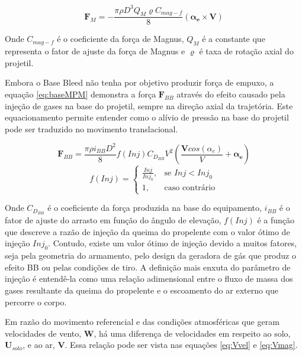 \begin{equation}
    \label{eq:magnusMPM}
    \boldsymbol{F}_{M} = -\frac{\pi \rho D^{3} Q_{M} \varrho C_{mag-f}}{8}(\boldsymbol{\alpha_{e}} \times \boldsymbol{V})
\end{equation}

Onde \(C_{mag-f}\) é o coeficiente da força de Magnus, \(Q_{M}\) é a constante que representa o fator de ajuste da força de Magnus e \(\varrho\) é taxa de rotação axial do projetil.

Embora o Base Bleed não tenha por objetivo produzir força de empuxo, a equação \ref{eq:baseMPM} demonstra a força \(\textbf{F}_{BB}\) através do efeito causado pela injeção de gases na base do projetil, sempre na direção axial da trajetória. Este equacionamento permite entender como o alívio de pressão na base do projetil pode ser traduzido no movimento translacional.

\begin{equation} \label{eq:baseMPM}
    \boldsymbol{F}_{BB} = \frac{\pi \rho i_{BB} D^{2}}{8} f(Inj) C_{D_{BB}}V^{2} \left(\frac{\boldsymbol{V}cos(\alpha_{e})}{V} +\boldsymbol{\alpha_{e}}\right)
\end{equation}
%
\begin{equation}
f(Inj) =\begin{cases}
			\frac{Inj}{Inj_{0}}, & \text{se \(Inj < Inj_{0}\)}\\
            1, & \text{caso contrário}
		 \end{cases}
\end{equation}

Onde \(C_{D_{BB}}\) é o coeficiente da força produzida na base do equipamento, \(i_{BB}\) é o fator de ajuste do arrasto em função do ângulo de elevação, \(f(Inj)\) é a função que descreve a razão de injeção da queima do propelente com o valor ótimo de injeção \(Inj_{0}\). Contudo, existe um valor ótimo de injeção devido a muitos fatores, seja pela geometria do armamento, pelo design da geradora de gás que produz o efeito BB ou pelas condições de tiro. A definição mais enxuta do parâmetro de injeção é entendê-la como uma relação adimensional entre o fluxo de massa dos gases resultante da queima do propelente e o escoamento do ar externo que percorre o corpo.

Em razão do movimento referencial e das condições atmosféricas que geram velocidades de vento, \(\boldsymbol{W}\), há uma diferença de velocidades em respeito ao solo, \(\boldsymbol{U}_{solo}\), e ao ar, \(\boldsymbol{V}\). Essa relação pode ser vista nas equações \ref{eq:Vvel} e \ref{eq:Vmag}.

